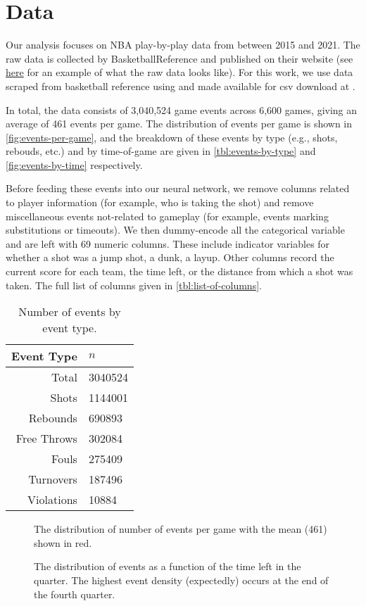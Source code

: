 \section{Data}

Our analysis focuses on NBA play-by-play data from between 2015 and 2021. The raw data is collected by BasketballReference and published on their website \cite{bbref} (see \href{https://www.basketball-reference.com/boxscores/pbp/202101200TOR.html#q1}{here} for an example of what the raw data looks like). For this work, we use data scraped from basketball reference using \cite{pbp-scraper-github} and made available for csv download at \cite{kaggle-pbp-data}.

In total, the data consists of 3,040,524 game events across 6,600 games, giving an average of 461 events per game. The distribution of events per game is shown in \autoref{fig:events-per-game}, and the breakdown of these events by type (e.g., shots, rebouds, etc.) and by time-of-game are given in \autoref{tbl:events-by-type} and \autoref{fig:events-by-time} respectively.

Before feeding these events into our neural network, we remove columns related to player information (for example, who is taking the shot) and remove miscellaneous events not-related to gameplay (for example, events marking substitutions or timeouts). We then dummy-encode all the categorical variable and are left with 69 numeric columns. These include indicator variables for whether a shot was a jump shot, a dunk, a layup. Other columns record the current score for each team, the time left, or the distance from which a shot was taken.
The full list of columns given in \autoref{tbl:list-of-columns}.

\begin{table}
	\centering
	\begin{tabular}{rl}
		\hline
		Event Type  & $n$     \\
		\hline
		Total       & 3040524 \\
		Shots       & 1144001 \\
		Rebounds    & 690893  \\
		Free Throws & 302084  \\
		Fouls       & 275409  \\
		Turnovers   & 187496  \\
		Violations  & 10884   \\
		\hline
	\end{tabular}
	\caption{Number of events by event type.}
	\label{tbl:events-by-type}
\end{table}

\begin{figure}
	\centering
	
	\caption{The distribution of number of events per game with the mean (461) shown in red.}
	\label{fig:events-per-game}
\end{figure}

\begin{figure}
	\centering
	
	\caption{The distribution of events as a function of the time left in the quarter. The highest event density (expectedly) occurs at the end of the fourth quarter.}
	\label{fig:events-by-time}
\end{figure}
